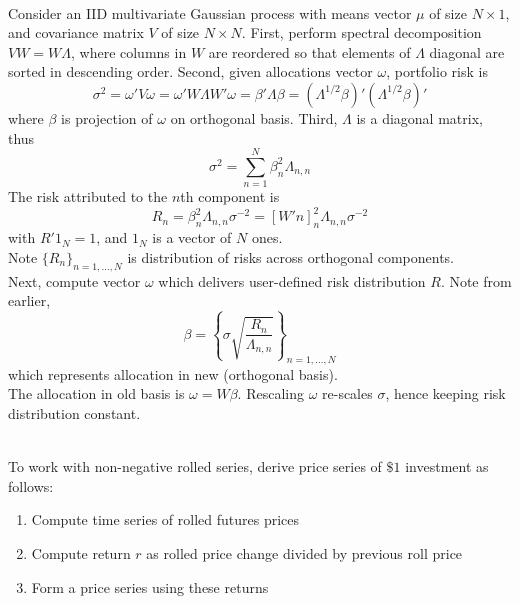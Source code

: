 \begin{method} \\
Consider an IID multivariate Gaussian process with means vector $\mu$ of size $N \times 1$, and covariance matrix $V$ of size $N \times N$. First, perform spectral decomposition $VW = W \Lambda$, where columns in $W$ are reordered so that elements of $\Lambda$ diagonal are sorted in descending order. Second, given allocations vector $\omega$, portfolio risk is
\begin{equation*}
\sigma^2 = \omega' V \omega = \omega' W \Lambda W' \omega = \beta' \Lambda \beta = (\Lambda^{1/2} \beta)' (\Lambda^{1/2} \beta)' \nonumber
\end{equation*}
 where $\beta$ is projection of $\omega$ on orthogonal basis. Third, $\Lambda$ is a diagonal matrix, thus
\begin{equation*}
\sigma^2 = \sum\limits_{n=1}^N \beta^2_n \Lambda_{n,n} \nonumber
\end{equation*}
The risk attributed to the $n$th component is
\begin{equation*}
R_n = \beta^2_n \Lambda_{n,n}\sigma^{-2} = [W' n]^2_n \Lambda_{n,n} \sigma^{-2} \nonumber
\end{equation*}
with $R' 1_N = 1$, and $1_N$ is a vector of $N$ ones.\\
Note $\{R_n\}_{n=1, \ldots, N}$ is distribution of risks across orthogonal components.\\
Next, compute vector $\omega$ which delivers user-defined risk distribution $R$. Note from earlier,
\begin{equation*}
\beta = \left\{ \sigma \sqrt{\frac{R_n}{\Lambda_{n,n}}} \right\}_{n = 1, \ldots, N} \nonumber
\end{equation*}
which represents allocation in new (orthogonal basis).\\
The allocation in old basis is $\omega = W \beta$. Rescaling $\omega$ re-scales $\sigma$, hence keeping risk distribution constant.
\end{method}

\begin{method} \\
To work with non-negative rolled series, derive price series of $\$ 1$ investment as follows:
\begin{enumerate}[label=\roman*.]
\setlength{\itemsep}{0pt}
\item Compute time series of rolled futures prices
\item Compute return $r$ as rolled price change divided by previous roll price
\item Form a price series using these returns
\end{enumerate}
\end{method}

